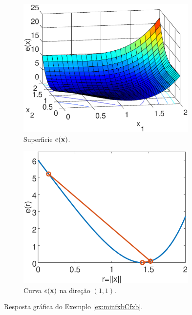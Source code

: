 \begin{figure}[h!]
     \centering
     \begin{subfigure}[b]{0.49\textwidth}
         \centering
         \includegraphics[width=0.98\textwidth]{chapters/minimization-fx/mfiles/fx1/surfcfx.eps}
         \caption{Superficie $e(\VECTOR{x})$. }
         \label{fig:ex:minfxbCfxb:a}
     \end{subfigure}
     \hfill
     \begin{subfigure}[b]{0.49\textwidth}
         \centering
         \includegraphics[width=0.98\textwidth]{chapters/minimization-fx/mfiles/fx1/plotfx.eps}
         \caption{Curva $e(\VECTOR{x})$ na direção $(1,1)$.}
         \label{fig:ex:minfxbCfxb:b}
     \end{subfigure}
        \caption{Resposta gráfica do Exemplo \ref{ex:minfxbCfxb}. }
        \label{fig:ex:minfxbCfxb}
\end{figure}


